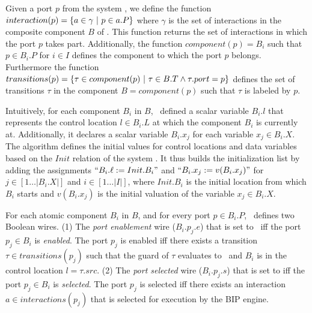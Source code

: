 Given a port $p$ from the system \Pm, we define the function
$interaction(p) = \{ a \in \gamma~|~p \in a.P \}$ where $\gamma$
is the set of interactions in the composite component $B$ of \Pm.
This function returns the set of interactions in which the port 
$p$ takes part. Additionally, the function 
$component(p) = B_i$ such that $p \in B_i.P$ for $i \in I$ defines
the component to which the port $p$ belongs. Furthermore the function
$transitions(p) = \{ \tau \in component(p)~|~\tau \in B.T \land \tau.port = p \}$ defines the 
set of transitions $\tau$ in the component $B = component(p)$ such that $\tau$ 
is labeled by $p$. 

Intuitively, for each component $B_i$ in $B$, \biptool~defined a scalar variable 
$B_i.l$ that represents the control location $l \in B_i.L$ at which the 
component $B_i$ is currently at. Additionally, it declares a scalar variable
$B_i.x_j$ for each variable $x_j \in B_i.X$. 
The algorithm defines the initial values for control locations and data variables 
based on the $Init$ relation of the system \Pm. It thus builds the initialization 
list by adding the assignments $``B_i.\ell := Init.B_i"$ and $``B_i.x_j := v(B_i.x_j)"$
for $j \in [1\ldots|B_i.X|]$ and $i \in [1\ldots|I|]$, where $Init.B_i$ is 
the initial location from which $B_i$ starts and $v(B_i.x_j)$ is the initial valuation of the
variable $x_j \in B_i.X$.


For each atomic component $B_i$ in $B$, and for every port $p \in B_i.P$, 
\biptool~defines two Boolean wires. 
(1) The {\em port enablement} wire ($B_i.p_j.e$) that is set to \true~iff the port $p_j \in B_i$ is 
{\em enabled}. The port $p_j$ is enabled iff there exists a transition $\tau \in transitions(p_j)$
such that the guard of $\tau$ evaluates to \true~and $B_i$ is in the control location $l = \tau.src$.
(2) The {\em port selected} wire ($B_i.p_j.s$) that is set to \true{} iff the port $p_j \in B_i$ is
{\em selected}. The port $p_j$ is selected iff there exists an interaction $a \in interactions(p_j)$
that is selected for execution by the BIP engine.

